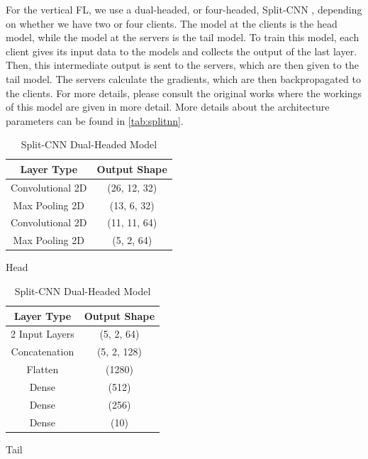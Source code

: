 For the vertical FL, we use a dual-headed, or four-headed, Split-CNN \cite{10.1145/3297858.3304038, 10.48550/arxiv.2104.00489}, depending on whether we have two or four clients. The model at the clients is the head model, while the model at the servers is the tail model. To train this model, each client gives its input data to the models and collects the output of the last layer. Then, this intermediate output is sent to the servers, which are then given to the tail model. The servers calculate the gradients, which are then backpropagated to the clients. For more details, please consult the original works where the workings of this model are given in more detail. More details about the architecture parameters can be found in \autoref{tab:splitnn}.

\begin{table}[!h]
    \begin{subtable}[h]{0.49\textwidth}
        \centering
        \begin{tabular}{c|c}
            \hline \hline
            Layer Type       & Output Shape \\ \hline \hline
            Convolutional 2D & (26, 12, 32) \\ \hline
            Max Pooling 2D   & (13, 6, 32) \\ \hline
            Convolutional 2D & (11, 11, 64) \\ \hline
            Max Pooling 2D   & (5, 2, 64)   \\ \hline
        \end{tabular}
        \caption{Head}
    \end{subtable}
    \hfill
    \begin{subtable}[h]{0.49\textwidth}
        \centering
        \begin{tabular}{c|c}
            \hline\hline
            Layer Type     & Output Shape \\ \hline\hline
            2 Input Layers & (5, 2, 64)   \\ \hline
            Concatenation  & (5, 2, 128)  \\ \hline
            Flatten        & (1280)       \\ \hline
            Dense          & (512)        \\ \hline
            Dense          & (256)        \\ \hline
            Dense          & (10)         \\ \hline
        \end{tabular}
        \caption{Tail}
     \end{subtable}
     \caption{Split-CNN Dual-Headed Model}
     \label{tab:splitnn}
\end{table}

